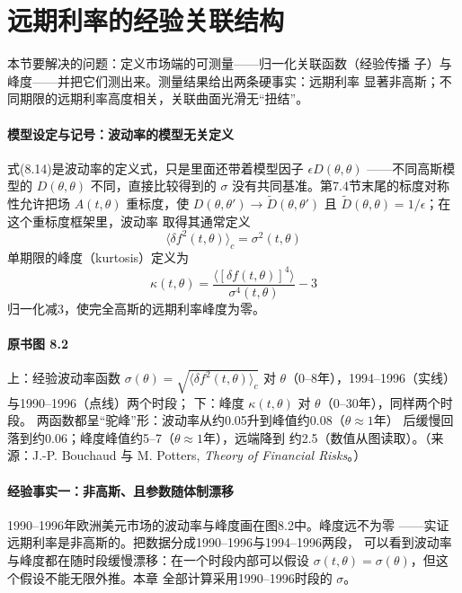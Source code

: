 \section{远期利率的经验关联结构}

本节要解决的问题：定义市场端的可测量——归一化关联函数（经验传播
子）与峰度——并把它们测出来。测量结果给出两条硬事实：远期利率
显著非高斯；不同期限的远期利率高度相关，关联曲面光滑无“扭结”。

\paragraph{模型设定与记号：波动率的模型无关定义}
式(8.14)是波动率的定义式，只是里面还带着模型因子 $\epsilon D(\theta,\theta)$
——不同高斯模型的 $D(\theta,\theta)$ 不同，直接比较得到的
$\sigma$ 没有共同基准。第7.4节末尾的标度对称性允许把场 $A(t,\theta)$
重标度，使 $D(\theta,\theta')\to\tilde{D}(\theta,\theta')$ 且
$\tilde{D}(\theta,\theta)=1/\epsilon$；在这个重标度框架里，波动率
取得其通常定义
\begin{equation*}
\langle\delta f^{2}(t,\theta)\rangle_c=\sigma^{2}(t,\theta)
\tag{8.15}
\end{equation*}
单期限的峰度（kurtosis）定义为
\begin{equation*}
\kappa(t,\theta)=\frac{\langle[\delta f(t,\theta)]^{4}\rangle}
{\sigma^{4}(t,\theta)}-3
\tag{8.16}
\end{equation*}
归一化减3，使完全高斯的远期利率峰度为零。

\paragraph{原书图 8.2}\quad 上：经验波动率函数
$\sigma(\theta)=\sqrt{\langle\delta f^{2}(t,\theta)\rangle_c}$ 对
$\theta$（0--8年），1994--1996（实线）与1990--1996（点线）两个时段；
下：峰度 $\kappa(t,\theta)$ 对 $\theta$（0--30年），同样两个时段。
两函数都呈“驼峰”形：波动率从约0.05升到峰值约0.08（$\theta\approx1$年）
后缓慢回落到约0.06；峰度峰值约5--7（$\theta\approx1$年），远端降到
约2.5（数值从图读取）。（来源：J.-P. Bouchaud 与 M. Potters,
\textit{Theory of Financial Risks}。）

\paragraph{经验事实一：非高斯、且参数随体制漂移}
1990--1996年欧洲美元市场的波动率与峰度画在图8.2中。峰度远不为零
——实证远期利率是非高斯的。把数据分成1990--1996与1994--1996两段，
可以看到波动率与峰度都在随时段缓慢漂移：在一个时段内部可以假设
$\sigma(t,\theta)=\sigma(\theta)$，但这个假设不能无限外推。本章
全部计算采用1990--1996时段的 $\sigma$。

